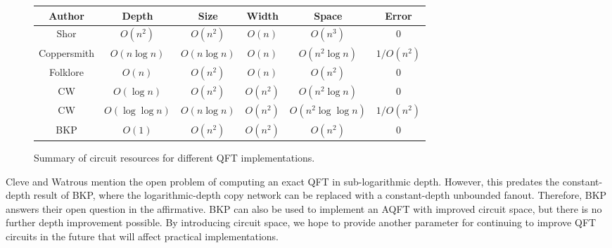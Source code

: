 \begin{center}
\begin{figure*}
\begin{tabular}{|c|c|c|c|c|c|}
\hline
\textbf{Author} & \textbf{Depth} & \textbf{Size} & \textbf{Width} & \textbf{Space} & \textbf{Error}\\
\hline
Shor & $O(n^2)$ & $O(n^2)$ & $O(n)$ & $O(n^3)$ & 0\\
Coppersmith & $O(n\log n)$ & $O(n\log n)$ & $O(n)$ & $O(n^2\log n)$ & $1/O(n^2)$ \\
Folklore & $O(n)$ & $O(n^2)$ & $O(n)$ & $O(n^2)$ & 0\\
CW & $O(\log n)$ & $O(n^2)$ & $O(n^2)$ & $O(n^2 \log n)$ & 0\\
CW & $O(\log \log n)$ & $O(n \log n)$ & $O(n^2)$ & $O(n^2 \log\log n)$ & $1/O(n^2)$\\
BKP & $O(1)$ & $O(n^2)$ & $O(n^2)$ & $O(n^2)$ & 0\\
\hline
\end{tabular}
\caption{Summary of circuit resources for different QFT implementations.}
\label{tab:qft-summary}
\end{figure*}
\end{center}

Cleve and Watrous mention the open problem of computing an exact QFT in
sub-logarithmic depth. However, this predates the constant-depth result of
BKP, where the logarithmic-depth copy network can be replaced with a
constant-depth unbounded fanout. Therefore, BKP answers their open
question in the affirmative. BKP can also be used to implement an
AQFT with improved circuit space, but there is no further depth improvement
possible. By introducing circuit space, we hope to provide another parameter
for continuing to improve QFT circuits in the future that will affect
practical implementations.
